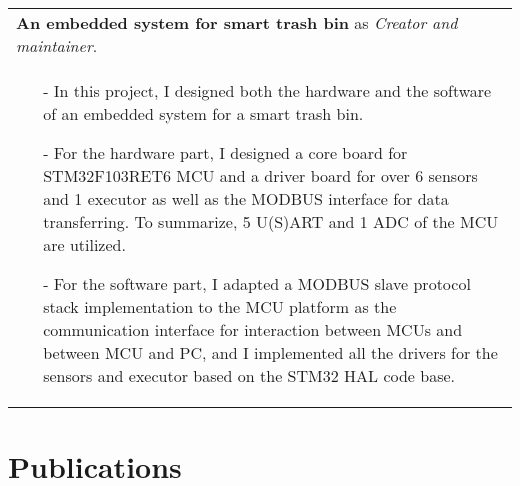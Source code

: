 \documentclass[a4paper,12pt]{article}
\newcommand{\signed}[1]{%
\unskip\nobreak\hfil\penalty50
   \hskip2em\hbox{}\nobreak\hfil#1
   \parfillskip=0pt \finalhyphendemerits=0 }
\begin{document}
\begin{tabularx}{\linewidth}{ @{}X@{} }
    \textbf{An embedded system for smart trash bin} as \textit{Creator and maintainer}.
    \signed{Dec. 2020 - May 2021} \\[3.75pt]
    \begin{minipage}[t]{\linewidth}
        \begin{itemize}[nosep,after=\strut, leftmargin=1em, itemsep=3pt]
            \item[-] In this project, I designed both the hardware and the software of an embedded system for a smart trash bin.
            \item[-] For the hardware part, I designed a core board for STM32F103RET6 MCU and a driver board for over 6 sensors
            and 1 executor as well as the MODBUS interface for data transferring. To summarize, 5 U(S)ART and 1 ADC of the MCU are utilized.
            \item[-] For the software part, I adapted a MODBUS slave protocol stack implementation to the MCU platform as the communication
            interface for interaction between MCUs and between MCU and PC, and I implemented all the drivers for the sensors and executor
            based on the STM32 HAL code base.
        \end{itemize}
        \end{minipage}
\end{tabularx}

\section{Publications}
\end{document}
